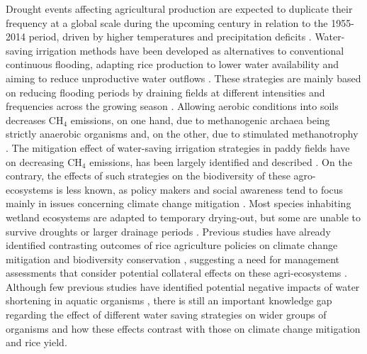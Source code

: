 Drought events affecting agricultural production are expected to duplicate their frequency at a global scale during the upcoming century in relation to the 1955-2014 period, driven by higher temperatures and precipitation deficits \citep{feng2023}. Water-saving irrigation methods have been developed as alternatives to conventional continuous flooding, adapting rice production to lower water availability and aiming to reduce unproductive water outflows \citep{tuong2003}. These strategies are mainly based on reducing flooding periods by draining fields at different intensities and frequencies across the growing season \citep{kumar2019alternate}. Allowing aerobic conditions into soils decreases CH$_{4}$ emissions, on one hand, due to methanogenic archaea being strictly anaerobic organisms and, on the other, due to stimulated methanotrophy \citep{sass1992, knowles1993}. The mitigation effect of water-saving irrigation strategies in paddy fields have on decreasing CH$_{4}$ emissions, has been largely identified and described \citep{yan2005, fertitta-roberts2019}. On the contrary, the effects of such strategies on the biodiversity of these agro-ecosystems is less known, as policy makers and social awareness tend to focus mainly in issues concerning climate change mitigation \citep{rusch2022}. Most species inhabiting wetland ecosystems are adapted to temporary drying-out, but some are unable to survive droughts or larger drainage periods \citep{biggs1994, williams1996, williams2000}. Previous studies have already identified contrasting outcomes of rice agriculture policies on climate change mitigation and biodiversity conservation \citep{perez-mendez2022}, suggesting a need for management assessments that consider potential collateral effects on these agri-ecosystems \citep{perez-mendez2022}. Although few previous studies have identified potential negative impacts of water shortening in aquatic organisms \citep{mogi1993, lupi2013, watanabe2013, herring2021}, there is still an important knowledge gap regarding the effect of different water saving strategies on wider groups of organisms and how these effects contrast with those on climate change mitigation and rice yield.\\

